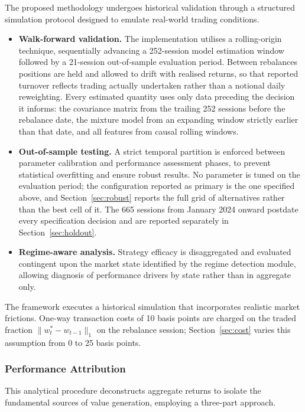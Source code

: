 \documentclass{singlecol-new}
\theoremstyle{TH}{
\newtheorem{lemma}{Lemma}
\newtheorem{theorem}[lemma]{Theorem}
\newtheorem{corrolary}[lemma]{Corrolary}
\newtheorem{conjecture}[lemma]{Conjecture}
\newtheorem{proposition}[lemma]{Proposition}
\newtheorem{claim}[lemma]{Claim}
\newtheorem{stheorem}[lemma]{Wrong Theorem}
\newtheorem{algorithm}{Algorithm}
}
\theoremstyle{THrm}{
\newtheorem{definition}{Definition}[section]
\newtheorem{question}{Question}[section]
\newtheorem{remark}{Remark}
\newtheorem{scheme}{Scheme}
}
\theoremstyle{THhit}{
\newtheorem{case}{Case}[section]
}
\begin{document}
The proposed methodology undergoes historical validation through a structured simulation
protocol designed to emulate real-world trading conditions.

\begin{itemize}
\item \textbf{Walk-forward validation.} The implementation utilises a rolling-origin
technique, sequentially advancing a 252-session model estimation window followed by a
21-session out-of-sample evaluation period. Between rebalances positions are held and
allowed to drift with realised returns, so that reported turnover reflects trading
actually undertaken rather than a notional daily reweighting. Every estimated quantity
uses only data preceding the decision it informs:
the covariance matrix from the trailing 252 sessions before the rebalance date, the
mixture model from an expanding window strictly earlier than that date, and all features
from causal rolling windows.
\item \textbf{Out-of-sample testing.} A strict temporal partition is enforced between
parameter calibration and performance assessment phases, to prevent statistical
overfitting and ensure robust results. No parameter is tuned on the evaluation period; the
configuration reported as primary is the one specified above, and
Section~\ref{sec:robust} reports the full grid of alternatives rather than the best cell
of it. The 665 sessions from January 2024 onward postdate every specification decision
and are reported separately in Section~\ref{sec:holdout}.
\item \textbf{Regime-aware analysis.} Strategy efficacy is disaggregated and evaluated
contingent upon the market state identified by the regime detection module, allowing
diagnosis of performance drivers by state rather than in aggregate only.
\end{itemize}

The framework executes a historical simulation that incorporates realistic market
frictions. One-way transaction costs of 10 basis points are charged on the traded
fraction $\|w^{\ast}_t - w_{t-1}\|_1$ on the rebalance session;
Section~\ref{sec:cost} varies this assumption from 0 to 25 basis points.

\subsubsection{Performance Attribution}

This analytical procedure deconstructs aggregate returns to isolate the fundamental
sources of value generation, employing a three-part approach.
\end{document}

